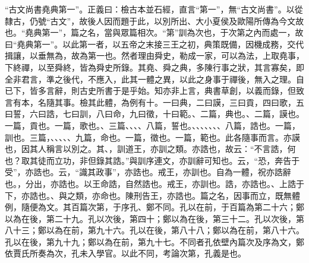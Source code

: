  {\noindent\shu{}\fzkt “古文尚書堯典第一”。正義曰：檢古本並石經，直言“第一”，無“古文尚書”。以從隸古，仍號“古文”，故後人因而題于此，以別所出、大小夏侯及歐陽所傳為今文故也。“堯典第一”，篇之名，當與眾篇相次。“第”訓為次也，于次第之內而處一，故曰“堯典第一”。以此第一者，以五帝之末接三王之初，典策既備，因機成務，交代揖讓，以垂無為，故為第一也。然者理由舜史，勒成一家，可以為法，上取堯事，下終禪，以至舜終，皆為舜史所錄。其堯、舜之典，多陳行事之狀，其言寡矣，即全非君言，準之後代，不應入，此其一體之異，以此之身事于禪後，無入之理。自已下，皆多言辭，則古史所書于是乎始。知亦非上言，典書草創，以義而錄，但致言有本，名隨其事。檢其此體，為例有十。一曰典，二曰謨，三曰貢，四曰歌，五曰誓，六曰誥，七曰訓，八曰命，九曰徵，十曰範。、二篇，典也。、二篇，謨也。一篇，貢也。一篇，歌也。、三篇、、、、八篇，誓也。、、、、、、、八篇，誥也。一篇，訓也。三篇，、、、、、九篇，命也。一篇，徵也。一篇，範也。此各隨事而言。亦謨也，因其人稱言以別之。其、，訓道王，亦訓之類。亦誥也，故云：“不言誥，何也？取其徒而立功，非但錄其誥。”與訓序連文，亦訓辭可知也。云，“恐，奔告于受”，亦誥也。云，“識其政事”，亦誥也。戒王，亦訓也。自為一體，祝亦誥辭也。，分出，亦誥也。以王命誥，自然誥也。戒王，亦訓也。誥，亦誥也。、上誥于下，亦誥也。、與之類，亦命也。陳刑告王，亦誥也。篇之名，因事而立，既無體例，隨便為文。其百篇次第，于序孔、鄭不同。孔以在前，于百篇為第二十六；鄭以為在後，第二十九。孔以次後，第四十；鄭以為在後，第三十二。孔以次後，第八十三；鄭以為在前，第九十六。孔以在後，第八十八；鄭以為在前，第八十六。孔以在後，第九十九；鄭以為在前，第九十七。不同者孔依壁內篇次及序為文，鄭依賈氏所奏為次，孔未入學官。以此不同，考論次第，孔義是也。 \par}

